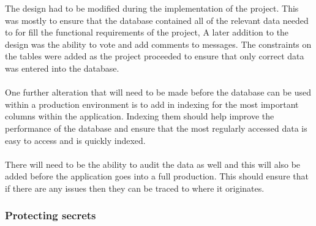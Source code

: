 The design had to be modified during the implementation of the project. This was mostly to ensure that the database contained all of the relevant data needed to for fill the functional requirements of the project, A later addition to the design was the ability to vote and add comments to messages. The constraints on the tables were added as the project proceeded to ensure that only correct data was entered into the database.\\
\\
One further alteration that will need to be made before the database can be used within a production environment is to add in indexing for the most important columns within the application. Indexing them should help improve the performance of the database and ensure that the most regularly accessed data is easy to access and is quickly indexed.\\
\\
There will need to be the ability to audit the data as well and this will also be added before the application goes into a full production. This should ensure that if there are any issues then they can be traced to where it originates.

\subsubsection{Protecting secrets}
\label{sec:database_security}

